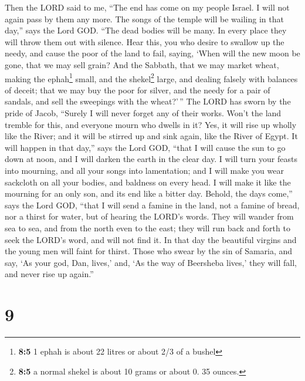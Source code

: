 Then the LORD said to me, ``The end has come on my people Israel. I will
not again pass by them any more.  The songs of the temple
will be wailing in that day,'' says the Lord GOD. ``The dead bodies will
be many. In every place they will throw them out with silence.
 Hear this, you who desire to swallow up the needy, and
cause the poor of the land to fail,  saying, `When will
the new moon be gone, that we may sell grain? And the Sabbath, that we
may market wheat, making the ephah\footnote{\textbf{8:5} 1 ephah is
  about 22 litres or about 2/3 of a bushel} small, and the
shekel\footnote{\textbf{8:5} a normal shekel is about 10 grams or about
  0. 35 ounces.} large, and dealing falsely with balances of deceit;
 that we may buy the poor for silver, and the needy for a
pair of sandals, and sell the sweepings with the wheat?'\,''
 The LORD has sworn by the pride of Jacob, ``Surely I will
never forget any of their works.  Won't the land tremble
for this, and everyone mourn who dwells in it? Yes, it will rise up
wholly like the River; and it will be stirred up and sink again, like
the River of Egypt.  It will happen in that day,'' says
the Lord GOD, ``that I will cause the sun to go down at noon, and I will
darken the earth in the clear day.  I will turn your
feasts into mourning, and all your songs into lamentation; and I will
make you wear sackcloth on all your bodies, and baldness on every head.
I will make it like the mourning for an only son, and its end like a
bitter day.  Behold, the days come,'' says the Lord GOD,
``that I will send a famine in the land, not a famine of bread, nor a
thirst for water, but of hearing the LORD's words.  They
will wander from sea to sea, and from the north even to the east; they
will run back and forth to seek the LORD's word, and will not find it.
 In that day the beautiful virgins and the young men will
faint for thirst.  Those who swear by the sin of Samaria,
and say, `As your god, Dan, lives,' and, `As the way of Beersheba
lives,' they will fall, and never rise up again.''

\hypertarget{section-8}{%
\section{9}\label{section-8}}

